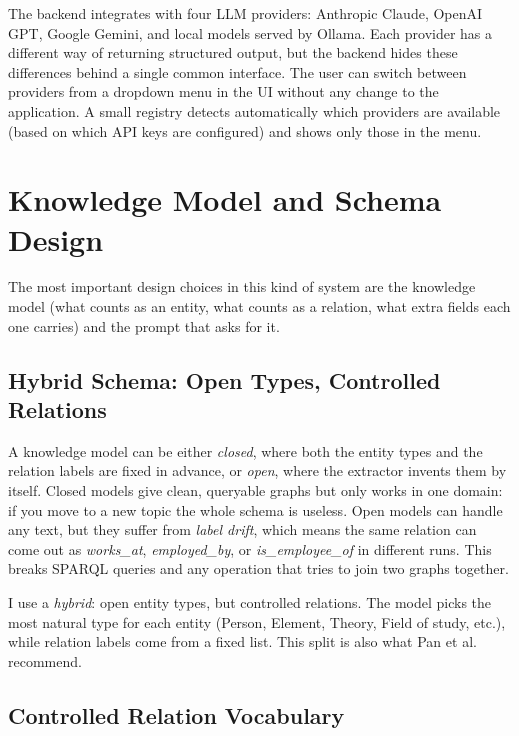 \documentclass[11pt,a4paper]{article}
\begin{document}
The backend integrates with four LLM providers: Anthropic Claude, OpenAI GPT, Google Gemini, and local models served by Ollama. Each provider has a different way of returning structured output, but the backend hides these differences behind a single common interface. The user can switch between providers from a dropdown menu in the UI without any change to the application. A small registry detects automatically which providers are available (based on which API keys are configured) and shows only those in the menu.


\section{Knowledge Model and Schema Design}\label{sec:design}

The most important design choices in this kind of system are the knowledge model (what counts as an entity, what counts as a relation, what extra fields each one carries) and the prompt that asks for it. 
\subsection{Hybrid Schema: Open Types, Controlled Relations}

A knowledge model can be either \emph{closed}, where both the entity types and the relation labels are fixed in advance, or \emph{open}, where the extractor invents them by itself. Closed models give clean, queryable graphs but only works in one domain: if you move to a new topic the whole schema is useless. Open models can handle any text, but they suffer from \emph{label drift}, which means the same relation can come out as \textit{works\_at}, \textit{employed\_by}, or \textit{is\_employee\_of} in different runs. This breaks SPARQL queries and any operation that tries to join two graphs together.

I use a \emph{hybrid}: open entity types, but controlled relations. The model picks the most natural type for each entity (Person, Element, Theory, Field of study, etc.), while relation labels come from a fixed list. This split is also what Pan et al.~\cite{pan2024unifying} recommend.

\subsection{Controlled Relation Vocabulary}\label{sec:vocab}
\end{document}
